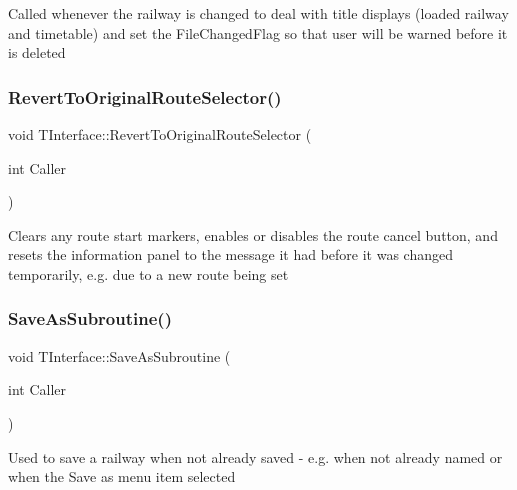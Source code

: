 Called whenever the railway is changed to deal with title displays (loaded railway and timetable) and set the File\+Changed\+Flag so that user will be warned before it is deleted \mbox{\label{class_t_interface_a0f47d9e893d3558de2e6d9082b3fadd0}} 
\subsubsection{\texorpdfstring{Revert\+To\+Original\+Route\+Selector()}{RevertToOriginalRouteSelector()}}
{\footnotesize\ttfamily void T\+Interface\+::\+Revert\+To\+Original\+Route\+Selector (\begin{DoxyParamCaption}\item[{int}]{Caller }\end{DoxyParamCaption})\hspace{0.3cm}{\ttfamily [private]}}

Clears any route start markers, enables or disables the route cancel button, and resets the information panel to the message it had before it was changed temporarily, e.\+g. due to a new route being set \mbox{\label{class_t_interface_a1b3189e6a50555f5952652d12b978e57}} 
\subsubsection{\texorpdfstring{Save\+As\+Subroutine()}{SaveAsSubroutine()}}
{\footnotesize\ttfamily void T\+Interface\+::\+Save\+As\+Subroutine (\begin{DoxyParamCaption}\item[{int}]{Caller }\end{DoxyParamCaption})\hspace{0.3cm}{\ttfamily [private]}}

Used to save a railway when not already saved -\/ e.\+g. when not already named or when the \textquotesingle{}Save as\textquotesingle{} menu item selected \mbox{\label{class_t_interface_af4c5cddc6749a720766bf875c423fe79}} 
